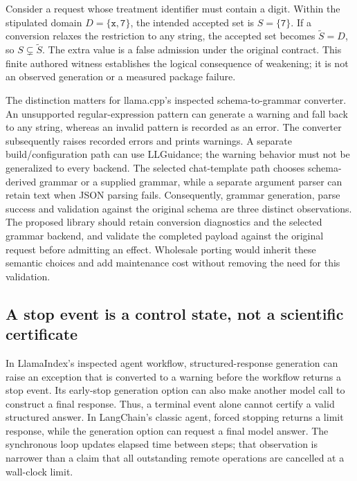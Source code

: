 Consider a request whose treatment identifier must contain a digit. Within the stipulated domain
\(D=\{\texttt{x},\texttt{7}\}\), the intended accepted set is
\(S=\{\texttt{7}\}\). If a conversion relaxes the restriction to any string, the accepted set becomes
\(\widetilde S=D\), so \(S\subsetneq\widetilde S\). The extra value is a false admission under the
original contract. This finite authored witness establishes the logical consequence of weakening;
it is not an observed generation or a measured package failure.~\citep{exec28_dl_reference}

The distinction matters for llama.cpp's inspected schema-to-grammar converter. An unsupported
regular-expression pattern can generate a warning and fall back to any string, whereas an invalid
pattern is recorded as an error. The converter subsequently raises recorded errors and prints
warnings. A separate build/configuration path can use LLGuidance; the warning behavior must not be
generalized to every backend. The selected chat-template path chooses schema-derived grammar or a
supplied grammar, while a separate argument parser can retain text when JSON parsing fails.
Consequently, grammar generation, parse success and validation against the original schema are
three distinct observations. The proposed library should retain conversion diagnostics and the
selected grammar backend, and validate the completed payload against the original request before
admitting an effect. Wholesale porting would inherit these semantic choices and add maintenance
cost without removing the need for this validation.~\citep{exec28_dl_llamacpp}

\subsection{A stop event is a control state, not a scientific certificate}
In LlamaIndex's inspected agent workflow, structured-response generation can raise an exception
that is converted to a warning before the workflow returns a stop event. Its early-stop generation
option can also make another model call to construct a final response. Thus, a terminal event alone
cannot certify a valid structured answer. In LangChain's classic agent, forced stopping returns a
limit response, while the generation option can request a final model answer. The synchronous loop
updates elapsed time between steps; that observation is narrower than a claim that all outstanding
remote operations are cancelled at a wall-clock limit.~\citep{exec28_dl_llama_index,exec28_dl_langchain}

